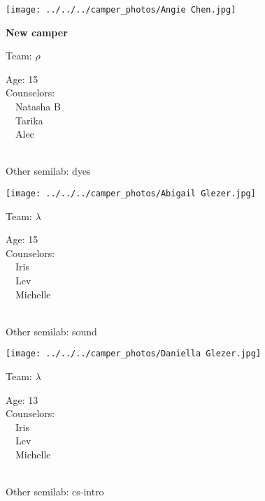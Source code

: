 \documentclass[10pt,letterpaper, landscape]{article}
\begin{document}
\horizontalshiftfornextsticker
\renewcommand{\baselinestretch}{1} \begin{sticker}
\noindent\begin{minipage}{0.5\textwidth}\texttt{[image: ../../../camper\_photos/Angie Chen.jpg]}\end{minipage}\begin{minipage}{0.45\textwidth}
\textbf{New camper} 

Team: {\Large $\rho$}

Age:        15\\
Counselors: \\\ \ Natasha B\\\ \ Tarika\\\ \ Alec\\
\end{minipage} \\ \vspace{0.07in}
Other semilab: dyes
\end{sticker}
\verticalshiftfornextsticker
\renewcommand{\baselinestretch}{1} \begin{sticker}
\noindent\begin{minipage}{0.5\textwidth}\texttt{[image: ../../../camper\_photos/Abigail Glezer.jpg]}\end{minipage}\begin{minipage}{0.45\textwidth}
Team: {\Large $\lambda$}

Age:        15\\
Counselors: \\\ \ Iris\\\ \ Lev\\\ \ Michelle\\
\end{minipage} \\ \vspace{0.07in}
Other semilab: sound
\end{sticker}
\horizontalshiftfornextsticker
\renewcommand{\baselinestretch}{1} \begin{sticker}
\noindent\begin{minipage}{0.5\textwidth}\texttt{[image: ../../../camper\_photos/Daniella Glezer.jpg]}\end{minipage}\begin{minipage}{0.45\textwidth}
Team: {\Large $\lambda$}

Age:        13\\
Counselors: \\\ \ Iris\\\ \ Lev\\\ \ Michelle\\
\end{minipage} \\ \vspace{0.07in}
Other semilab: cs-intro
\end{sticker}
\end{document}
